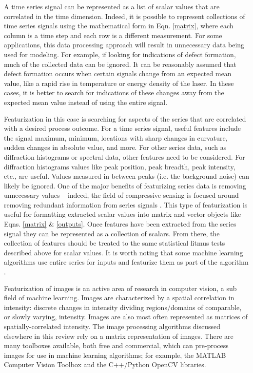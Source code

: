 A time series signal can be represented as a list of scalar values that are correlated in the time dimension. Indeed, it is possible to represent collections of time series signals using the mathematical form in Eqn. \ref{matrix}, where each column is a time step and each row is a different measurement. For some applications, this data processing approach will result in unnecessary data being used for modeling. For example, if looking for indications of defect formation, much of the collected data can be ignored. It can be reasonably assumed that defect formation occurs when certain signals change from an expected mean value, like a rapid rise in temperature or energy density of the laser. In these cases, it is better to search for indications of these changes away from the expected mean value instead of using the entire signal.

Featurization in this case is searching for aspects of the series that are correlated with a desired process outcome. For a time series signal, useful features include the signal maximum, minimum, locations with sharp changes in curvature, sudden changes in absolute value, and more. For other series data, such as diffraction histograms or spectral data, other features need to be considered. For diffraction histograms values like peak position, peak breadth, peak intensity, etc., are useful. Values measured in between peaks (i.e. the background noise) can likely be ignored. One of the major benefits of featurizing series data is removing unnecessary values -- indeed, the field of compressive sensing is focused around removing redundant information from series signals \cite{Candes2008}. This type of featurization is useful for formatting extracted scalar values into matrix and vector objects like Eqns. \ref{matrix} \& \ref{outputs}. Once features have been extracted from the series signal they can be represented as a collection of scalars. From there, the collection of features should be treated to the same statistical litmus tests described above for scalar values. It is worth noting that some machine learning algorithms use entire series for inputs and featurize them as part of the algorithm \cite{Long2007, Long2009, Kusne2015a}.

Featurization of images is an active area of research in computer vision, a sub field of machine learning. Images are characterized by a spatial correlation in intensity: discrete changes in intensity dividing regions/domains of comparable, or slowly varying, intensity. Images are also most often represented as matrices of spatially-correlated intensity. The image processing algorithms discussed elsewhere in this review rely on a matrix representation of images. There are many toolboxes available, both free and commercial, which can pre-process images for use in machine learning algorithms; for example, the MATLAB Computer Vision Toolbox and the C++/Python OpenCV libraries.

